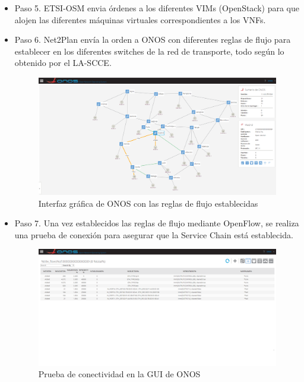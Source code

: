 \begin{itemize}
	
	\item Paso 5. ETSI-OSM envia órdenes a los diferentes VIMs (OpenStack) para que alojen las diferentes máquinas virtuales correspondientes a los VNFs.
	
	\item Paso 6. Net2Plan envía la orden a ONOS con diferentes reglas de flujo para establecer en los diferentes switches de la red de transporte, todo según lo obtenido por el LA-SCCE.
	
	\begin{figure}[!ht]
		\centering
		\includegraphics[width=0.7\linewidth]{imagenes/topo_onos}
		\caption{Interfaz gráfica de ONOS con las reglas de flujo establecidas}
		\label{fig:topo_onos}
	\end{figure}

	\clearpage

	\item Paso 7. Una vez establecidos las reglas de flujo mediante OpenFlow, se realiza una prueba de conexión para asegurar que la Service Chain está establecida.
	
	\begin{figure}[!ht]
		\centering
		\includegraphics[width=0.7\linewidth]{imagenes/onos_flowrules}
		\caption{Prueba de conectividad en la GUI de ONOS}
		\label{fig:onosflowrules}
	\end{figure}


\end{itemize}


